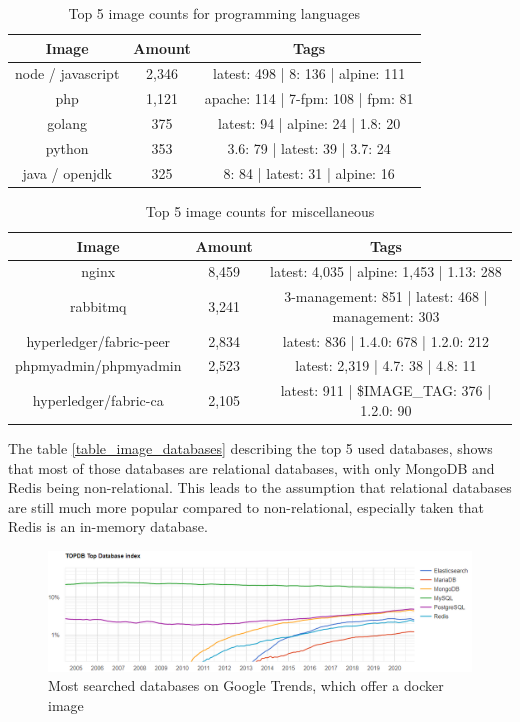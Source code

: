 \begin{table}[h!]
    \centering
    \begin{tabular}{ |c|c|c| }
    \hline
    Image & Amount & Tags \\
    \hline
         node / javascript & 2,346 & latest: 498 | 8: 136 | alpine: 111\\
         php & 1,121 & apache: 114 | 7-fpm: 108 | fpm: 81 \\
         golang & 375 & latest: 94 | alpine: 24 | 1.8: 20 \\
         python & 353 & 3.6: 79 | latest: 39 | 3.7: 24\\
         java / openjdk & 325 & 8: 84 | latest: 31 | alpine: 16\\
    \hline
    \end{tabular}
    \caption{Top 5 image counts for programming languages}
    \label{table_image_languages}
\end{table}

\begin{table}[h!]
    \centering
    \begin{tabular}{ |c|c|c| }
    \hline
    Image & Amount & Tags \\
    \hline
         nginx & 8,459 & latest: 4,035 | alpine: 1,453 | 1.13: 288\\
         rabbitmq & 3,241 & 3-management: 851 | latest: 468 | management: 303\\
         hyperledger/fabric-peer & 2,834 & latest: 836 | 1.4.0: 678 | 1.2.0: 212\\
         phpmyadmin/phpmyadmin & 2,523 & latest: 2,319 | 4.7: 38 | 4.8: 11 \\
         hyperledger/fabric-ca & 2,105 & latest: 911 | \$IMAGE\_TAG: 376 | 1.2.0: 90\\
    \hline
    \end{tabular}
    \caption{Top 5 image counts for miscellaneous}
    \label{table_image_misc}
\end{table}

The table \ref{table_image_databases} describing the top 5 used databases, shows that most of those databases are relational databases, with only MongoDB and Redis being non-relational. This leads to the assumption that relational databases are still much more popular compared to non-relational, especially taken that Redis is an in-memory database.

\begin{figure}[H]
    \centering
    \includegraphics[scale=0.5]{graphics/databases_top_popularity_ranking.png}
    \caption{Most searched databases on Google Trends, which offer a docker image}
    \label{fig:databases_top_ranking}
\end{figure}

